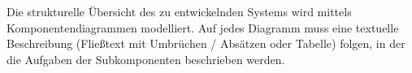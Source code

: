\begin{tcolorbox}
Die strukturelle Übersicht des zu entwickelnden Systems wird mittels Komponentendiagrammen modelliert. 
Auf jedes Diagramm muss eine textuelle Beschreibung (Fließtext mit Umbrüchen / Absätzen oder Tabelle) folgen, in der die Aufgaben der Subkomponenten beschrieben werden. 
\end{tcolorbox}